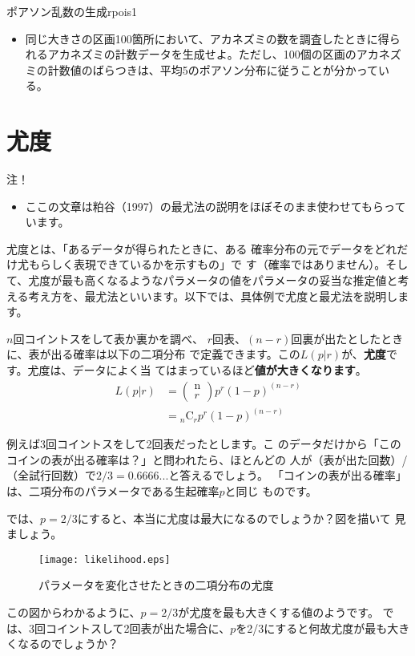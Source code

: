 \begin{exercise}{ポアソン乱数の生成}{rpois1}
\begin{itemize}
  \item 同じ大きさの区画100箇所において、アカネズミの数を調査したときに得られるアカネズミの計数データを生成せよ。ただし、100個の区画のアカネズミの計数値のばらつきは、平均5のポアソン分布に従うことが分かっている。
\end{itemize}
\end{exercise}

\clearpage
\section{尤度}
\begin{itembox}[l]{注！}
 \begin{itemize}
  \item ここの文章は粕谷（1997）の最尤法の説明をほぼそのまま使わせてもらっています。
 \end{itemize}
\end{itembox}
尤度とは、「あるデータが得られたときに、ある
確率分布の元でデータをどれだけ尤もらしく表現できているかを示すもの」で
す（確率ではありません）。そして、尤度が最も高くなるようなパラメータの値をパラメータの妥当な推定値と考える考え方を、最尤法といいます。以下では、具体例で尤度と最尤法を説明します。

$n$回コイントスをして表か裏かを調べ、
$r$回表、$(n - r)$回裏が出たとしたときに、表が出る確率は以下の二項分布
で定義できます。この$L(p|r)$が、\textbf{尤度}です。尤度は、データによく当
てはまっているほど\textbf{値が大きくなります}。
\begin{equation}
\begin{split}
 L(p|r) &= \begin{pmatrix} \mathrm{n} \\ r \end{pmatrix}
 p^r(1 - p)^{(n - r)} \\
 &= {_{n}\mathrm{C}_{r}} p^r(1 - p)^{(n - r)}
\end{split}
\end{equation}

例えば3回コイントスをして2回表だったとします。こ
のデータだけから「このコインの表が出る確率は？」と問われたら、ほとんどの
人が（表が出た回数）/（全試行回数）で$2/3 = 0.6666...$と答えるでしょう。
「コインの表が出る確率」は、二項分布のパラメータである生起確率$p$と同じ
ものです。

では、$p = 2/3$にすると、本当に尤度は最大になるのでしょうか？図を描いて
見ましょう。
\begin{figure}[htb]
\begin{center}
\graphicspath{{3_glm/figs/}}
\texttt{[image: likelihood.eps]}\\
\caption{パラメータを変化させたときの二項分布の尤度}
 \label{like}
\end{center}
\end{figure}
この図からわかるように、$p = 2/3$が尤度を最も大きくする値のようです。
では、3回コイントスして2回表が出た場合に、$p$を2/3にすると何故尤度が最も大きくなるのでしょうか？

